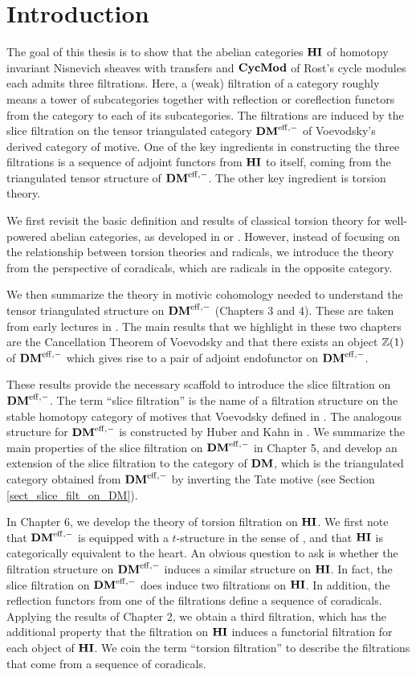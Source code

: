 \chapter{Introduction} 

The goal of this thesis is to show that the abelian categories 
$\mathbf{HI}$ of homotopy invariant Nisnevich sheaves with transfers and 
$\mathbf{CycMod}$ of Rost's cycle modules each admits three filtrations. 
Here, a (weak) filtration of a category roughly means a tower of 
subcategories together with reflection or coreflection functors 
from the category to each of its subcategories. The filtrations 
are induced by the slice filtration on the tensor triangulated 
category $\mathbf{DM}^{\mathrm{eff},-}$ of Voevodsky's derived category of motive. One 
of the key ingredients in constructing the three filtrations is a 
sequence of adjoint functors from $\mathbf{HI}$ to itself, coming from the 
triangulated tensor structure of $\mathbf{DM}^{\mathrm{eff},-}$. The other key 
ingredient is torsion theory.
 
We first revisit the basic definition and results of classical 
torsion theory for well-powered abelian categories, as developed 
in \cite{BJV} or \cite{DTor}. However, instead of focusing
on the relationship between torsion theories and radicals, we
introduce the theory from the perspective of coradicals, which are 
radicals in the opposite category.  

We then summarize the theory in motivic cohomology needed to 
understand the tensor triangulated structure on $\mathbf{DM}^{\mathrm{eff},-}$ 
(Chapters 3 and 4). These are taken from early lectures in 
\cite{MVW}. The main results that we highlight in these two 
chapters are the Cancellation Theorem of Voevodsky and that there 
exists an object $\mathbb{Z}(1)$ of $\mathbf{DM}^{\mathrm{eff},-}$ which gives rise to a pair of 
adjoint endofunctor on $\mathbf{DM}^{\mathrm{eff},-}$. 

These results provide the necessary scaffold to introduce the 
slice filtration on $\mathbf{DM}^{\mathrm{eff},-}$. The term ``slice filtration'' is the
name of a filtration structure on the stable homotopy category 
of motives that Voevodsky defined in \cite{VOP}. The analogous
structure for $\mathbf{DM}^{\mathrm{eff},-}$ is constructed by Huber and Kahn in 
\cite{HuKa}. We summarize the main properties of the slice 
filtration on $\mathbf{DM}^{\mathrm{eff},-}$ in Chapter 5, and develop an extension of
the slice filtration to the category of $\mathbf{DM}$, which is the
triangulated category obtained from $\mathbf{DM}^{\mathrm{eff},-}$ by inverting the
Tate motive (see Section \ref{sect_slice_filt_on_DM}).

In Chapter 6, we develop the theory of torsion filtration on
$\mathbf{HI}$. We first note that $\mathbf{DM}^{\mathrm{eff},-}$ is equipped with a 
$t$-structure in the sense of \cite{BBD}, and that $\mathbf{HI}$ is categorically
equivalent to the heart. An obvious question to ask is whether the
filtration structure on $\mathbf{DM}^{\mathrm{eff},-}$ induces a similar structure on
$\mathbf{HI}$. In fact, the slice filtration on $\mathbf{DM}^{\mathrm{eff},-}$ does induce two
filtrations on $\mathbf{HI}$. In addition, the reflection functors from
one of the filtrations define a sequence of coradicals. Applying
the results of Chapter 2, we obtain a third filtration, which has
the additional property that the filtration on $\mathbf{HI}$ induces a 
functorial filtration for each object of $\mathbf{HI}$. We coin the
term ``torsion filtration'' to describe the filtrations that
come from a sequence of coradicals.

